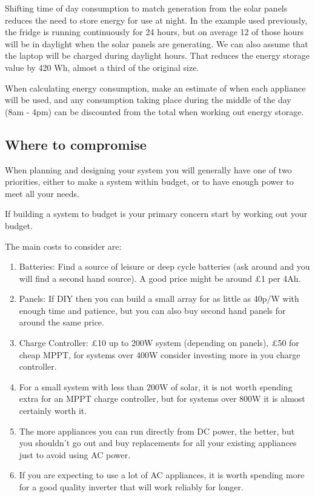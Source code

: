 \documentclass{article}
\theoremstyle{definition}
\theoremstyle{definition}
\theoremstyle{remark}
\begin{document}
    Shifting time of day consumption to match generation from the solar panels reduces the need to store energy for use at night. In the example used previously, the fridge is running continuously for 24 hours, but on average 12 of those hours will be in daylight when the solar panels are generating. We can also assume that the laptop will be charged during daylight hours. That reduces the energy storage value by 420 Wh, almost a third of the original size. 

    When calculating energy consumption, make an estimate of when each appliance will be used, and any consumption taking place during the middle of the day (8am - 4pm) can be discounted from the total when working out energy storage.
  

  \subsection{Where to compromise} %
  \label{sub:where_to_compromise}

    When planning and designing your system you will generally have one of two priorities, either to make a system within budget, or to have enough power to meet all your needs.

    If building a system to budget is your primary concern start by working out your budget. 

    The main costs to consider are:

    \begin{enumerate}
      \item Batteries: Find a source of leisure or deep cycle batteries (ask around and you will find a second hand source). A good price might be around £1 per 4Ah.
      \item Panels: If DIY then you can build a small array for as little as 40p/W with enough time and patience, but you can also buy second hand panels for around the same price.
      \item Charge Controller: £10 up to 200W system (depending on panels), £50 for cheap MPPT, for systems over 400W consider investing more in you charge controller.
      \item For a small system with less than 200W of solar, it is not worth spending extra for an MPPT charge controller, but for systems over 800W it is almost certainly worth it.
      \item The more appliances you can run directly from DC power, the better, but you shouldn’t go out and buy replacements for all your existing appliances just to avoid using AC power.
      \item If you are expecting to use a lot of AC appliances, it is worth spending more for a good quality inverter that will work reliably for longer.
    \end{enumerate}
\end{document}
